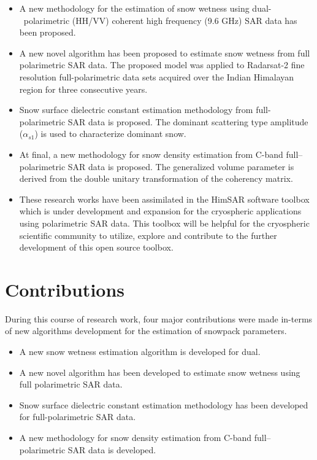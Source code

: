 \begin{itemize}
	\item A new methodology for the estimation of snow wetness using dual-~polarimetric (HH/VV) coherent high frequency (9.6 GHz) SAR data has been proposed.  
	
	\item A new novel algorithm has been proposed to estimate snow wetness from full polarimetric SAR data. The proposed model was applied to Radarsat-2 fine resolution full-polarimetric data sets acquired over the Indian Himalayan region for three consecutive years.   
	
	\item Snow surface dielectric constant estimation methodology from full-polarimetric SAR data is proposed. The dominant scattering type amplitude ($\alpha_{s1}$) is used to characterize dominant snow.
	
	\item At final, a new methodology for snow density estimation from C-band full--polarimetric SAR data is proposed. The generalized volume parameter is derived from the double unitary transformation of the coherency matrix. 
	
	\item These research works have been assimilated in the HimSAR software toolbox which is under development and expansion for the cryospheric applications using polarimetric SAR data. This toolbox will be helpful for the cryospheric scientific community to utilize, explore and contribute to the further development of this open source toolbox.
	   
\end{itemize}
\section{Contributions}
During this course of research work, four major contributions were made in-terms of new algorithms development for the estimation of snowpack parameters. 
\begin{itemize}
	\item A new snow wetness estimation algorithm is developed for dual.  
	\item A new novel algorithm has been developed to estimate snow wetness using full polarimetric SAR data.  
	\item Snow surface dielectric constant estimation methodology has been developed for full-polarimetric SAR data.   
	\item A new methodology for snow density estimation from C-band full--polarimetric SAR data is developed.  
\end{itemize}
